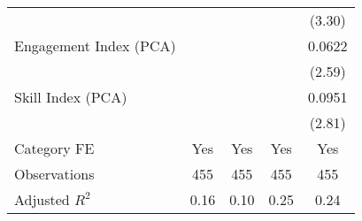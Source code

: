 {\begin{tabular}{l*{4}{c}}
                                   &                   &                   &                   &    (3.30)         \\
[1em]
Engagement Index (PCA)             &                   &                   &                   &    0.0622\sym{***}\\
                                   &                   &                   &                   &    (2.59)         \\
[1em]
Skill Index (PCA)                  &                   &                   &                   &    0.0951\sym{***}\\
                                   &                   &                   &                   &    (2.81)         \\
[1em]
Category FE                        &       Yes         &       Yes         &       Yes         &       Yes         \\
\hline
Observations                       &       455         &       455         &       455         &       455         \\
Adjusted \(R^{2}\)                 &      0.16         &      0.10         &      0.25         &      0.24         \\
\hline\hline
\end{tabular}
}
